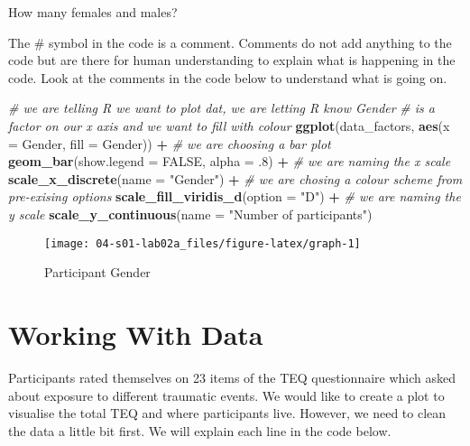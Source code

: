\documentclass[]{book}
\newenvironment{Shaded}{\begin{snugshade}}{\end{snugshade}}
\newcommand{\CommentTok}[1]{\textcolor[rgb]{0.56,0.35,0.01}{\textit{#1}}}
\newcommand{\DataTypeTok}[1]{\textcolor[rgb]{0.13,0.29,0.53}{#1}}
\newcommand{\FloatTok}[1]{\textcolor[rgb]{0.00,0.00,0.81}{#1}}
\newcommand{\KeywordTok}[1]{\textcolor[rgb]{0.13,0.29,0.53}{\textbf{#1}}}
\newcommand{\NormalTok}[1]{#1}
\newcommand{\OperatorTok}[1]{\textcolor[rgb]{0.81,0.36,0.00}{\textbf{#1}}}
\newcommand{\OtherTok}[1]{\textcolor[rgb]{0.56,0.35,0.01}{#1}}
\newcommand{\StringTok}[1]{\textcolor[rgb]{0.31,0.60,0.02}{#1}}
\begin{document}
How many females and males?

The \# symbol in the code is a comment. Comments do not add anything to the code but are there for human understanding to explain what is happening in the code. Look at the comments in the code below to understand what is going on.

\begin{Shaded}
\begin{Highlighting}[]
\CommentTok{# we are telling R we want to plot dat, we are letting R know Gender }
\CommentTok{# is a factor on our x axis and we want to fill with colour}
\KeywordTok{ggplot}\NormalTok{(data_factors, }\KeywordTok{aes}\NormalTok{(}\DataTypeTok{x =}\NormalTok{ Gender, }\DataTypeTok{fill =}\NormalTok{ Gender)) }\OperatorTok{+}
\StringTok{  }\CommentTok{# we are choosing a bar plot}
\StringTok{  }\KeywordTok{geom_bar}\NormalTok{(}\DataTypeTok{show.legend =} \OtherTok{FALSE}\NormalTok{, }\DataTypeTok{alpha =} \FloatTok{.8}\NormalTok{) }\OperatorTok{+}
\StringTok{  }\CommentTok{# we are naming the x scale}
\StringTok{  }\KeywordTok{scale_x_discrete}\NormalTok{(}\DataTypeTok{name =} \StringTok{"Gender"}\NormalTok{) }\OperatorTok{+}
\StringTok{  }\CommentTok{# we are chosing a colour scheme from pre-exising options}
\StringTok{  }\KeywordTok{scale_fill_viridis_d}\NormalTok{(}\DataTypeTok{option =} \StringTok{"D"}\NormalTok{) }\OperatorTok{+}
\StringTok{  }\CommentTok{# we are naming the y scale}
\StringTok{  }\KeywordTok{scale_y_continuous}\NormalTok{(}\DataTypeTok{name =} \StringTok{"Number of participants"}\NormalTok{)}
\end{Highlighting}
\end{Shaded}

\begin{figure}

{\centering \texttt{[image: 04-s01-lab02a\_files/figure-latex/graph-1]} 

}

\caption{Participant Gender}\label{fig:graph}
\end{figure}

\hypertarget{working-with-data}{%
\section{Working With Data}\label{working-with-data}}

Participants rated themselves on 23 items of the TEQ questionnaire which asked about exposure to different traumatic events. We would like to create a plot to visualise the total TEQ and where participants live. However, we need to clean the data a little bit first. We will explain each line in the code below.
\end{document}
